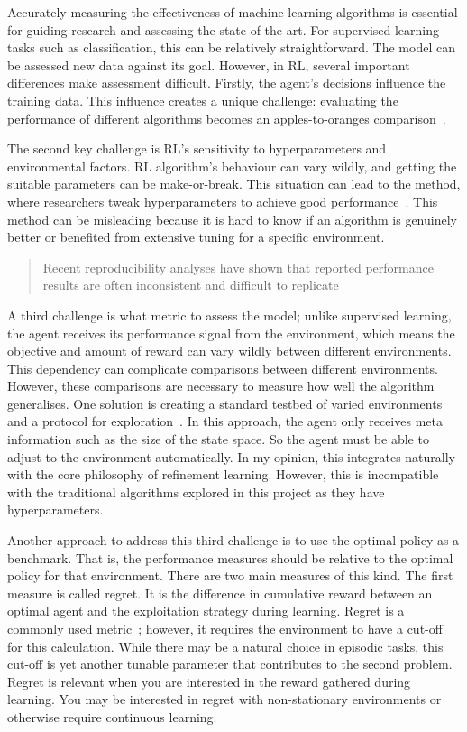 \documentclass[]{final_report}
\begin{document}
Accurately measuring the effectiveness of machine learning algorithms is essential for guiding research and assessing the state-of-the-art. For supervised learning tasks such as classification, this can be relatively straightforward. The model can be assessed new data against its goal. However, in RL, several important differences make assessment difficult. Firstly, the agent's decisions influence the training data. This influence creates a unique challenge: evaluating the performance of different algorithms becomes an apples-to-oranges comparison~\cite{sutton2018reinforcement}.

The second key challenge is RL's sensitivity to hyperparameters and environmental factors. RL algorithm's behaviour can vary wildly, and getting the suitable parameters can be make-or-break. This situation can lead to the  method, where researchers tweak hyperparameters to achieve good performance~\cite{evaluatingRL}. This method can be misleading because it is hard to know if an algorithm is genuinely better or benefited from extensive tuning for a specific environment. 

\begin{quote}
  Recent reproducibility analyses have shown that reported performance results are often inconsistent and difficult to replicate~\cite{evaluatingRL}
\end{quote}

\newpage
A third challenge is what metric to assess the model; unlike supervised learning, the agent receives its performance signal from the environment, which means the objective and amount of reward can vary wildly between different environments. This dependency can complicate comparisons between different environments. However, these comparisons are necessary to measure how well the algorithm generalises. One solution is creating a standard testbed of varied environments and a protocol for exploration~\cite{assessingDeepRL, evaluatingRL}. In this approach, the agent only receives meta information such as the size of the state space. So the agent must be able to adjust to the environment automatically. In my opinion, this integrates naturally with the core philosophy of refinement learning. However, this is incompatible with the traditional algorithms explored in this project as they have hyperparameters.

Another approach to address this third challenge is to use the optimal policy as a benchmark. That is, the performance measures should be relative to the optimal policy for that environment. There are two main measures of this kind. The first measure is called regret. It is the difference in cumulative reward between an optimal agent and the exploitation strategy during learning. Regret is a commonly used metric~\cite{modelFree}; however, it requires the environment to have a cut-off for this calculation. While there may be a natural choice in episodic tasks, this cut-off is yet another tunable parameter that contributes to the second problem. Regret is relevant when you are interested in the reward gathered during learning. You may be interested in regret with non-stationary environments or otherwise require continuous learning.
\end{document}
